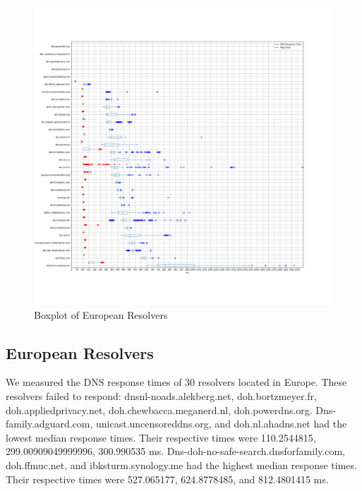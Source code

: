 \begin{figure}[!t]
    \includegraphics[width=\linewidth]{figures/100_Europe.png}
    \caption{Boxplot of European Resolvers}
    \label{fig:EurPlots}
\end{figure}

\subsection{European Resolvers}
We measured the DNS response times of 30 resolvers located in Europe. 
These resolvers failed to respond: dnsnl-noads.alekberg.net, doh.bortzmeyer.fr, doh.appliedprivacy.net, doh.chewbacca.meganerd.nl, doh.powerdns.org.
Dns-family.adguard.com, unicast.uncensoreddns.org, and doh.nl.ahadns.net had the lowest median response times.
Their respective times were 110.2544815, 299.00909049999996, 300.990535 ms. 
Dns-doh-no-safe-search.dnsforfamily.com, doh.ffmuc.net, and ibksturm.synology.me had the highest median response times. 
Their respective times were 527.065177, 624.8778485, and 812.4801415 ms.
